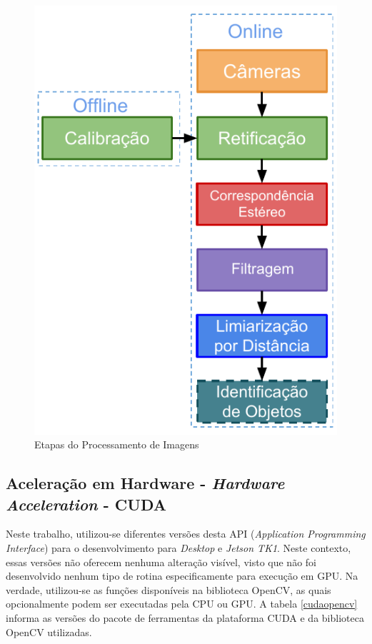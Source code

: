 \begin{figure}[H]
	\centering
	\includegraphics[scale=1.0]{./Resources/stereo_processor_steps3.pdf}
	\caption{Etapas do Processamento de Imagens}
	\label{stereo_processor_steps}
\end{figure}


\subsection{Aceleração em Hardware - \textit{Hardware Acceleration} - CUDA}

Neste trabalho, utilizou-se diferentes versões desta API (\textit{Application Programming Interface}) para o desenvolvimento para \textit{Desktop} e \textit{Jetson TK1}. Neste contexto, essas versões não oferecem nenhuma alteração visível, visto que não foi desenvolvido nenhum tipo de rotina especificamente para execução em GPU. Na verdade, utilizou-se as funções disponíveis na biblioteca OpenCV, as quais opcionalmente podem ser executadas pela CPU ou GPU. A tabela \ref{cudaopencv} informa as versões do pacote de ferramentas da plataforma CUDA e da biblioteca OpenCV utilizadas. 

